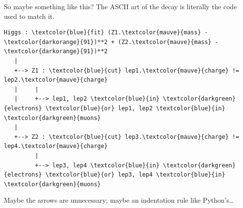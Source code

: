 \documentclass[aspectratio=169]{beamer}
\begin{document}
\begin{frame}[fragile]{So maybe something like this?}
\Large
\vspace{0.25 cm}
The ASCII art of the decay is literally the code used to match it.

\normalsize
\vspace{0.5 cm}
\begin{Verbatim}[commandchars=\\\{\}]
Higgs : \textcolor{blue}{fit} (Z1.\textcolor{mauve}{mass} - \textcolor{darkorange}{91})**2 + (Z2.\textcolor{mauve}{mass} - \textcolor{darkorange}{91})**2
   |
   +--> Z1 : \textcolor{blue}{cut} lep1.\textcolor{mauve}{charge} != lep2.\textcolor{mauve}{charge}
   |     |
   |     +--> lep1, lep2 \textcolor{blue}{in} \textcolor{darkgreen}{electrons} \textcolor{blue}{or} lep1, lep2 \textcolor{blue}{in} \textcolor{darkgreen}{muons}
   |
   +--> Z2 : \textcolor{blue}{cut} lep3.\textcolor{mauve}{charge} != lep4.\textcolor{mauve}{charge}
         |
         +--> lep3, lep4 \textcolor{blue}{in} \textcolor{darkgreen}{electrons} \textcolor{blue}{or} lep3, lep4 \textcolor{blue}{in} \textcolor{darkgreen}{muons}
\end{Verbatim}

\large
\vspace{0.5 cm}
Maybe the arrows are unnecessary; maybe an indentation rule like Python's\ldots
\end{frame}
\end{document}
